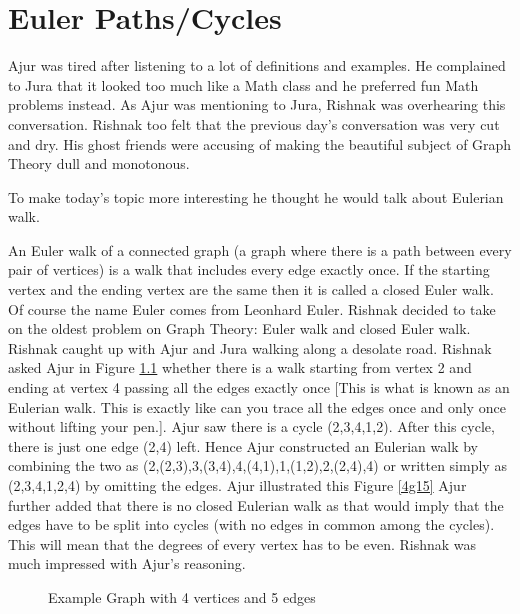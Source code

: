 \chapter{Euler Paths/Cycles}

Ajur was tired after listening to a lot of definitions and examples. He complained to Jura that it looked too much like a Math class and he preferred fun Math problems instead. As Ajur was mentioning to Jura, Rishnak was overhearing this conversation. Rishnak too felt that the previous day's conversation was very cut and dry. His ghost friends were accusing of making the beautiful subject of Graph Theory dull and monotonous.

To make today's topic more interesting he thought he would talk about Eulerian walk. 

An Euler walk of a connected graph (a graph where there is a path between every pair of vertices) is a walk that includes every edge exactly once. If the starting vertex and the ending vertex are the same then it is called a closed Euler walk. Of course the name Euler comes from Leonhard Euler.
Rishnak decided to take on the oldest problem on Graph Theory: Euler walk and closed Euler walk. Rishnak caught up with Ajur and Jura walking along a desolate road. Rishnak asked Ajur in  Figure \ref{4g1} whether there is a walk starting from vertex 2 and ending at vertex 4 passing all the edges exactly once [This is what is known as an Eulerian walk. This is exactly like can you trace all the edges once and only once without lifting your pen.]. Ajur saw there is a cycle (2,3,4,1,2). After this cycle, there is just one edge (2,4) left. Hence Ajur constructed an Eulerian walk by combining the two as (2,(2,3),3,(3,4),4,(4,1),1,(1,2),2,(2,4),4) or written simply as (2,3,4,1,2,4) by omitting the edges. Ajur illustrated this Figure \ref{4g15} Ajur further added that there is no closed Eulerian walk as that would imply that the edges have to be split into cycles (with no edges in common among the cycles). This will mean that the degrees of every vertex has to be even. Rishnak was much impressed with Ajur's reasoning. 


\begin{figure}
\begin{center}
\caption{ Example Graph with 4 vertices and 5 edges}\label{4g1}
\end{center}
\end{figure}

